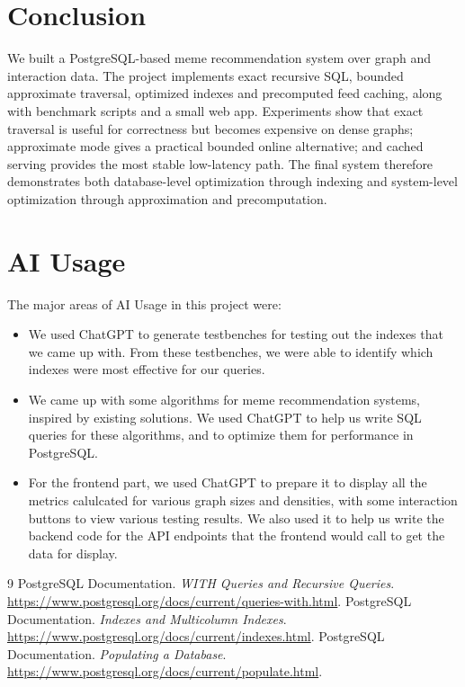 \documentclass[11pt,a4paper]{article}
\begin{document}
\section{Conclusion}
We built a PostgreSQL-based meme recommendation system over graph and interaction data. The project implements exact recursive SQL, bounded approximate traversal, optimized indexes and precomputed feed caching, along with benchmark scripts and a small web app. Experiments show that exact traversal is useful for correctness but becomes expensive on dense graphs; approximate mode gives a practical bounded online alternative; and cached serving provides the most stable low-latency path. The final system therefore demonstrates both database-level optimization through indexing and system-level optimization through approximation and precomputation.

\section{AI Usage}
The major areas of AI Usage in this project were:
\begin{itemize}
    \item We used ChatGPT to generate testbenches for testing out the indexes that we came up with. From these testbenches, we were able to identify which indexes were most effective for our queries.
    \item We came up with some algorithms for meme recommendation systems, inspired by existing solutions. We used ChatGPT to help us write SQL queries for these algorithms, and to optimize them for performance in PostgreSQL.
    \item For the frontend part, we used ChatGPT to prepare it to display all the metrics calulcated for various graph sizes and densities, with some interaction buttons to view various testing results. We also used it to help us write the backend code for the API endpoints that the frontend would call to get the data for display.

\end{itemize}


\begin{thebibliography}{9}
PostgreSQL Documentation. \textit{WITH Queries and Recursive Queries}. \url{https://www.postgresql.org/docs/current/queries-with.html}.
PostgreSQL Documentation. \textit{Indexes and Multicolumn Indexes}. \url{https://www.postgresql.org/docs/current/indexes.html}.
PostgreSQL Documentation. \textit{Populating a Database}. \url{https://www.postgresql.org/docs/current/populate.html}.
\end{thebibliography}
\end{document}
